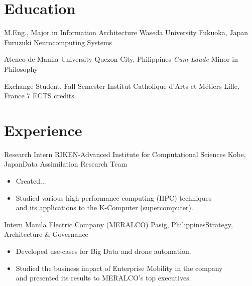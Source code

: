 \documentclass[11pt,a4paper,sans]{moderncv}
\begin{document}
\maketitle


\section{Education}
        {M.Eng., Major in Information Architecture}
        {Waseda University}
        {Fukuoka, Japan}{}
        {Furuzuki Neurocomputing Systems}

        {Ateneo de Manila University}
        {Quezon City, Philippines}
        {\textit{Cum Laude}}
        {Minor in Philosophy}

        {Exchange Student, Fall Semester}
        {Institut Catholique d'Arts et M\'etiers}
        {Lille, France}{}
        {7 ECTS credits}

\section{Experience}

        {Research Intern}
        {RIKEN-Advanced Institute for Computational Sciences}
        {Kobe, Japan}{Data Assimilation Research Team}
        {
            \begin{itemize}
                \item Created...
                \item Studied various high-performance computing (HPC)
                techniques\\and its applications to the K-Computer (supercomputer).
            \end{itemize}
        }

        {Intern}
        {Manila Electric Company (MERALCO)}
        {Pasig, Philippines}{Strategy, Architecture \& Governance}
        {
            \begin{itemize}
                \item Developed use-cases for Big Data and drone automation.
                \item Studied the business impact of Enterprise Mobility in the company
                \\and presented its results to MERALCO's top executives.
            \end{itemize}
        }
\end{document}
